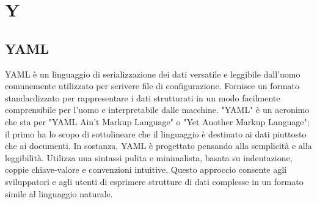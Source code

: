 \section{Y}

\vspace{2em}
\subsection*{YAML}
YAML è un linguaggio di serializzazione dei dati versatile e leggibile dall'uomo comunemente utilizzato per scrivere file di configurazione.
Fornisce un formato standardizzato per rappresentare i dati strutturati in un modo facilmente comprensibile per l'uomo e interpretabile dalle macchine. "YAML" è un acronimo che sta per "YAML Ain't Markup Language" o "Yet Another Markup Language"; il primo ha lo scopo di sottolineare che il linguaggio è destinato ai dati piuttosto che ai documenti.
In sostanza, YAML è progettato pensando alla semplicità e alla leggibilità. Utilizza una sintassi pulita e minimalista, basata su indentazione, coppie chiave-valore e convenzioni intuitive. Questo approccio consente agli sviluppatori e agli utenti di esprimere strutture di dati complesse in un formato simile al linguaggio naturale.
